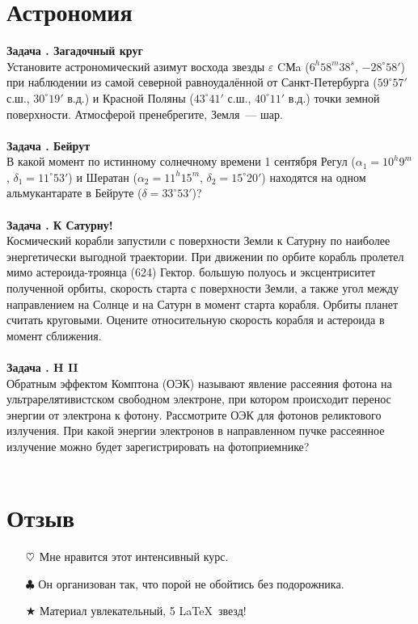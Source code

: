\documentclass[11pt]{article}
\newcounter{astron}[section]
\newcommand{\heart}{\ensuremath\heartsuit}
\newenvironment{astro}[1]{\textbf{\stepcounter{astron}Задача \theastron. #1 \vspace{5pt}\\}}{\\\\}
\begin{document}
    \section{Астрономия}
    \begin{astro}{Загадочный круг}
        Установите астрономический азимут восхода звезды $\varepsilon$ CМa ($6^h58^m38^s$, $-28^\circ58'$) при наблюдении из самой северной равноудалённой от Санкт-Петербурга ($59^\circ57'$ с.ш., $30^\circ19'$ в.д.) и Красной Поляны ($43^\circ41'$ с.ш., $40^\circ11'$ в.д.) точки земной поверхности. Атмосферой пренебрегите, Земля~--- шар.
    \end{astro}
    \begin{astro}{Бейрут}
        В какой момент по истинному солнечному времени 1 сентября Регул ($\alpha_1 = 10^h9^m$, $\delta_1 = 11^\circ53'$) и Шератан ($\alpha_2 = 11^h15^m$, $\delta_2 = 15^\circ20'$) находятся на одном альмукантарате в Бейруте ($\delta = 33^\circ53'$)?
    \end{astro}
    \begin{astro}{К Сатурну!}
        Космический корабли запустили с поверхности Земли к Сатурну по наиболее энергетически выгодной траектории. При движении по орбите корабль пролетел мимо астероида-троянца (624) Гектор.
     большую полуось и эксцентриситет полученной орбиты, скорость старта с поверхности Земли, а также угол между направлением на Солнце и на Сатурн в момент старта корабля. Орбиты планет считать круговыми. Оцените относительную скорость корабля и астероида в момент сближения.
    \end{astro}
    \begin{astro}{H II}
        Обратным эффектом Комптона (ОЭК) называют явление рассеяния фотона на ультрарелятивистском свободном электроне, при котором происходит перенос энергии от электрона к фотону.  Рассмотрите ОЭК для фотонов реликтового излучения. При какой энергии электронов в направленном пучке рассеянное излучение можно будет зарегистрировать на фотоприемнике?
    \end{astro}

    \section{Отзыв}
    \begin{itemize}
        \item[$\heart$] Мне нравится этот интенсивный курс.
        \item[$\clubsuit$] Он организован так, что порой не обойтись без подорожника.
        \item[$\bigstar$] Материал увлекательный, 5 \LaTeX ~звезд!
    \end{itemize}
\end{document}
